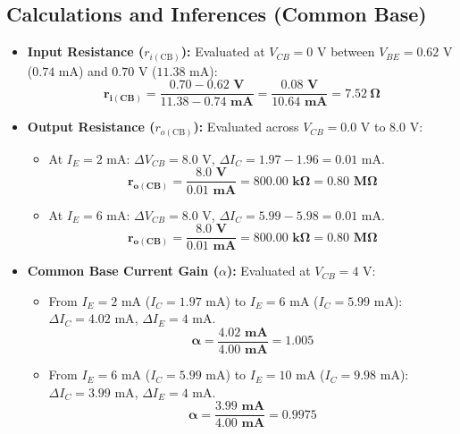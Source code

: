 \documentclass[11pt,a4paper]{article}
\begin{document}
\subsection{Calculations and Inferences (Common Base)}
\begin{itemize}
    \item \textbf{Input Resistance ($r_{i(\text{CB})}$):} Evaluated at $V_{CB} = 0\text{ V}$ between $V_{BE} = 0.62\text{ V}$ ($0.74\text{ mA}$) and $0.70\text{ V}$ ($11.38\text{ mA}$):
    \[
    \mathbf{r_{i(\text{CB})} = \frac{0.70 - 0.62\text{ V}}{11.38 - 0.74\text{ mA}} = \frac{0.08\text{ V}}{10.64\text{ mA}} = 7.52\ \Omega}
    \]
    \item \textbf{Output Resistance ($r_{o(\text{CB})}$):} Evaluated across $V_{CB} = 0.0\text{ V}$ to $8.0\text{ V}$:
    \begin{itemize}
        \item At $I_E = 2\text{ mA}$: $\Delta V_{CB} = 8.0\text{ V}$, $\Delta I_C = 1.97 - 1.96 = 0.01\text{ mA}$.
        \[
        \mathbf{r_{o(\text{CB})} = \frac{8.0\text{ V}}{0.01\text{ mA}} = 800.00\text{ k}\Omega = 0.80\text{ M}\Omega}
        \]
        \item At $I_E = 6\text{ mA}$: $\Delta V_{CB} = 8.0\text{ V}$, $\Delta I_C = 5.99 - 5.98 = 0.01\text{ mA}$.
        \[
        \mathbf{r_{o(\text{CB})} = \frac{8.0\text{ V}}{0.01\text{ mA}} = 800.00\text{ k}\Omega = 0.80\text{ M}\Omega}
        \]
    \end{itemize}
    \item \textbf{Common Base Current Gain ($\alpha$):} Evaluated at $V_{CB} = 4\text{ V}$:
    \begin{itemize}
        \item From $I_E = 2\text{ mA}$ ($I_C = 1.97\text{ mA}$) to $I_E = 6\text{ mA}$ ($I_C = 5.99\text{ mA}$): $\Delta I_C = 4.02\text{ mA}$, $\Delta I_E = 4\text{ mA}$.
        \[
        \mathbf{\alpha = \frac{4.02\text{ mA}}{4.00\text{ mA}} = 1.005}
        \]
      \item From $I_E = 6\text{ mA}$ ($I_C = 5.99\text{ mA}$) to $I_E = 10\text{ mA}$ ($I_C = 9.98\text{ mA}$): $\Delta I_C = 3.99\text{ mA}$, $\Delta I_E = 4\text{ mA}$.
        \[
        \mathbf{\alpha = \frac{3.99\text{ mA}}{4.00\text{ mA}} = 0.9975}
        \]


\end{itemize}
\end{itemize}
\end{document}
